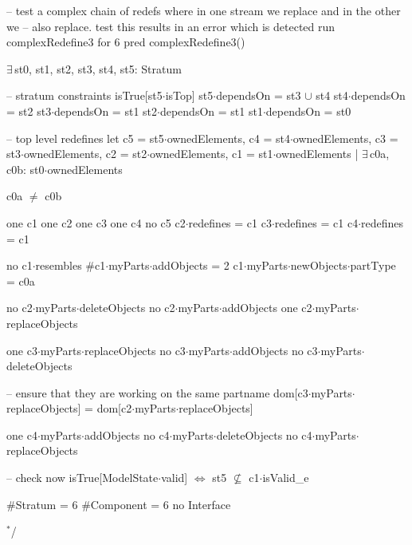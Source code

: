 -- test a complex chain of redefs where in one stream we replace and in the other we
-- also replace.  test this results in an error which is detected
run complexRedefine3 for 6
pred complexRedefine3()
{
  $\exists\,$st0, st1, st2, st3, st4, st5: Stratum
  {
    -- stratum constraints
    isTrue[st5$\cdot$isTop]
    st5$\cdot$dependsOn = st3 $\cup$ st4
    st4$\cdot$dependsOn = st2
    st3$\cdot$dependsOn = st1
    st2$\cdot$dependsOn = st1
    st1$\cdot$dependsOn = st0

    -- top level redefines
    let
      c5 = st5$\cdot$ownedElements,
      c4 = st4$\cdot$ownedElements,
      c3 = st3$\cdot$ownedElements,
      c2 = st2$\cdot$ownedElements,
      c1 = st1$\cdot$ownedElements |
    $\exists\,$c0a, c0b: st0$\cdot$ownedElements
    {
      c0a $\neq$ c0b
      
      one c1 one c2 one c3 one c4 no c5
      c2$\cdot$redefines = c1
      c3$\cdot$redefines  = c1
      c4$\cdot$redefines = c1
  
      no c1$\cdot$resembles
      #c1$\cdot$myParts$\cdot$addObjects = 2
      c1$\cdot$myParts$\cdot$newObjects$\cdot$partType = c0a
      
      no c2$\cdot$myParts$\cdot$deleteObjects
      no c2$\cdot$myParts$\cdot$addObjects
      one c2$\cdot$myParts$\cdot$replaceObjects
      
      one c3$\cdot$myParts$\cdot$replaceObjects
      no c3$\cdot$myParts$\cdot$addObjects
      no c3$\cdot$myParts$\cdot$deleteObjects
      
      -- ensure that they are working on the same partname
      dom[c3$\cdot$myParts$\cdot$replaceObjects] = dom[c2$\cdot$myParts$\cdot$replaceObjects]
      
      one c4$\cdot$myParts$\cdot$addObjects
      no c4$\cdot$myParts$\cdot$deleteObjects
      no c4$\cdot$myParts$\cdot$replaceObjects
      
      -- check now
      isTrue[ModelState$\cdot$valid] $\Longleftrightarrow$
      {
        st5 $\not\subseteq$ c1$\cdot$isValid_e
      }
    }
  }

  #Stratum = 6
  #Component = 6
  no Interface
} $\!\!\!^\ast\!$/
